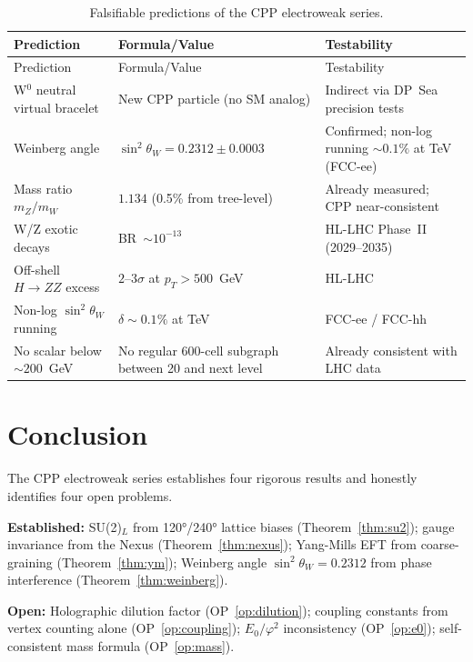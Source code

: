\documentclass[11pt,letterpaper]{article}
\newcommand{\phig}{\varphi}
\begin{document}
\begin{longtable}{@{}p{5cm}p{4cm}p{4cm}@{}}
\caption{Falsifiable predictions of the CPP electroweak series.}
\label{tab:predictions}\\
\toprule
Prediction & Formula/Value & Testability \\
\midrule
\endfirsthead
\toprule
Prediction & Formula/Value & Testability \\
\midrule
\endhead
\bottomrule
\endfoot
W$^0$ neutral virtual bracelet
  & New CPP particle (no SM analog)
  & Indirect via DP~Sea precision tests \\[4pt]
Weinberg angle
  & $\sin^2\theta_W = 0.2312\pm0.0003$
  & Confirmed; non-log running $\sim0.1\%$ at TeV (FCC-ee) \\[4pt]
Mass ratio $m_Z/m_W$
  & $1.134$ (0.5\% from tree-level)
  & Already measured; CPP near-consistent \\[4pt]
W/Z exotic decays
  & BR~$\sim10^{-13}$
  & HL-LHC Phase~II (2029--2035) \\[4pt]
Off-shell $H\to ZZ$ excess
  & $2$--$3\sigma$ at $p_T>500$~GeV
  & HL-LHC \\[4pt]
Non-log $\sin^2\theta_W$ running
  & $\delta\sim0.1\%$ at TeV
  & FCC-ee / FCC-hh \\[4pt]
No scalar below $\sim200$~GeV
  & No regular 600-cell subgraph between 20 and next level
  & Already consistent with LHC data \\
\end{longtable}

\section{Conclusion}

The CPP electroweak series establishes four rigorous results and
honestly identifies four open problems.

\textbf{Established:}
SU(2)$_L$ from 120°/240° lattice biases (Theorem~\ref{thm:su2});
gauge invariance from the Nexus (Theorem~\ref{thm:nexus});
Yang-Mills EFT from coarse-graining (Theorem~\ref{thm:ym});
Weinberg angle $\sin^2\theta_W = 0.2312$ from phase interference
(Theorem~\ref{thm:weinberg}).

\textbf{Open:}
Holographic dilution factor (OP~\ref{op:dilution}); coupling
constants from vertex counting alone (OP~\ref{op:coupling});
$E_0/\phig^2$ inconsistency (OP~\ref{op:e0}); self-consistent mass
formula (OP~\ref{op:mass}).
\end{document}
